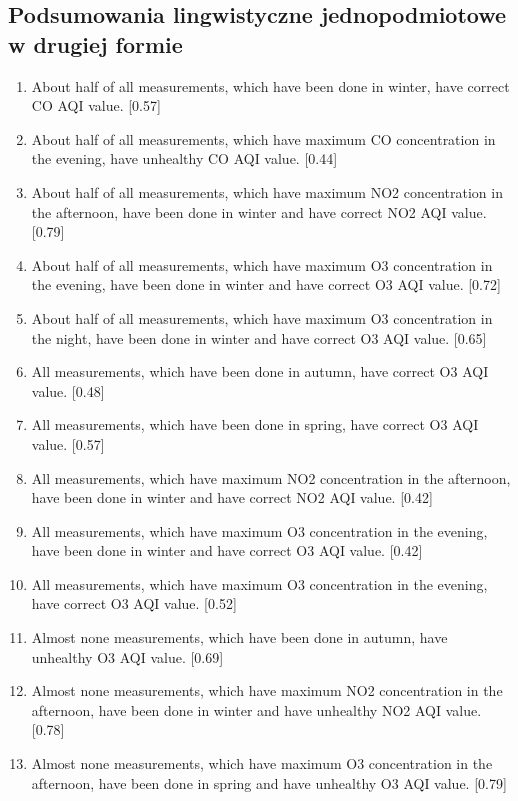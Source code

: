 \documentclass{classrep}
\begin{document}
{        \subsection{Podsumowania lingwistyczne jednopodmiotowe w drugiej formie} {
            \begin{enumerate}
                \item About half of all measurements, which have been done in winter, have correct CO AQI value. [0.57]
                \item About half of all measurements, which have maximum CO concentration in the evening, have unhealthy CO AQI value. [0.44]
                \item About half of all measurements, which have maximum NO2 concentration in the afternoon, have been done in winter and have correct NO2 AQI value. [0.79]
                \item About half of all measurements, which have maximum O3 concentration in the evening, have been done in winter and have correct O3 AQI value. [0.72]
                \item About half of all measurements, which have maximum O3 concentration in the night, have been done in winter and have correct O3 AQI value. [0.65]
                \item All measurements, which have been done in autumn, have correct O3 AQI value. [0.48]
                \item All measurements, which have been done in spring, have correct O3 AQI value. [0.57]
                \item All measurements, which have maximum NO2 concentration in the afternoon, have been done in winter and have correct NO2 AQI value. [0.42]
                \item All measurements, which have maximum O3 concentration in the evening, have been done in winter and have correct O3 AQI value. [0.42]
                \item All measurements, which have maximum O3 concentration in the evening, have correct O3 AQI value. [0.52]
                \item Almost none measurements, which have been done in autumn, have unhealthy O3 AQI value. [0.69]
                \item Almost none measurements, which have maximum NO2 concentration in the afternoon, have been done in winter and have unhealthy NO2 AQI value. [0.78]
                \item Almost none measurements, which have maximum O3 concentration in the afternoon, have been done in spring and have unhealthy O3 AQI value. [0.79]

\end{enumerate}}}
\end{document}
